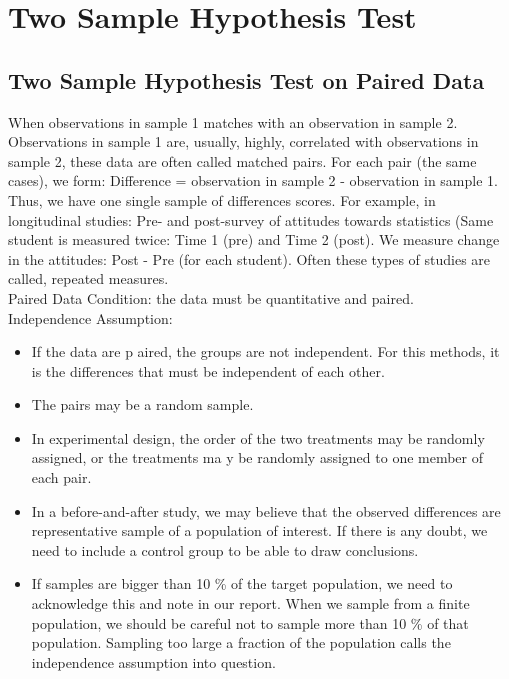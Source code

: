 \setcounter{chapter}{13}
\chapter{Two Sample Hypothesis Test}

\section{Two Sample Hypothesis Test on Paired Data}

When observations in sample 1 matches with an observation in sample 2. Observations in sample 1 are, usually, highly, correlated with observations in sample 2, these data are often called matched pairs. For each pair (the same cases), we form: Difference = observation in sample 2 - observation in sample 1. Thus, we have one single sample of differences scores. For example, in longitudinal studies: Pre- and post-survey of attitudes towards statistics (Same student is measured twice: Time 1 (pre) and Time 2 (post). We measure change in the attitudes: Post - Pre (for each student). Often these types of studies are called, repeated measures.\\

Paired Data Condition: the data must be quantitative and paired.\\

Independence Assumption:
\begin{itemize}
	\item If the data are p aired, the groups are not independent. For this methods, it is the differences that must be independent of each other.
	\item The pairs may be a random sample.
	\item In experimental design, the order of the two treatments may be randomly assigned, or the treatments ma y be randomly assigned to one member of each pair.
	\item In a before-and-after study, we may believe that the observed differences are representative sample of a population of interest. If there is any doubt, we need to include a control group to be able to draw conclusions.
	\item If samples are bigger than 10 \% of the target population, we need to acknowledge this and note in our report. When we sample from a ﬁnite population, we should be careful not to sample more than 10 \% of that population. Sampling too large a fraction of the population calls the independence assumption into question.
\end{itemize}

